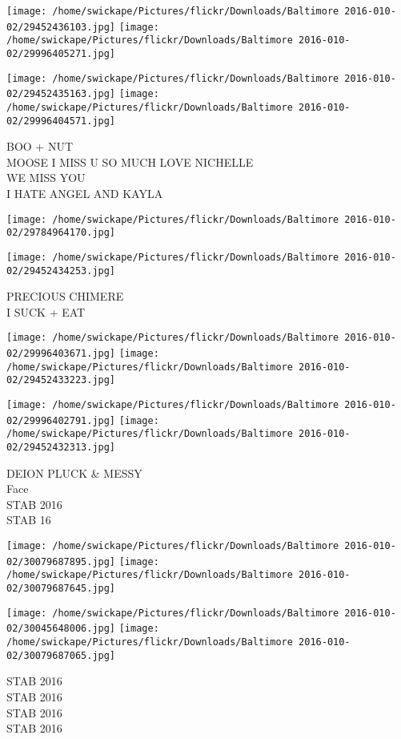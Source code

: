 \documentclass[10pt,letterpaper]{article}
\begin{document}
\texttt{[image: /home/swickape/Pictures/flickr/Downloads/Baltimore 2016-010-02/29452436103.jpg]}
\texttt{[image: /home/swickape/Pictures/flickr/Downloads/Baltimore 2016-010-02/29996405271.jpg]}

\texttt{[image: /home/swickape/Pictures/flickr/Downloads/Baltimore 2016-010-02/29452435163.jpg]}
\texttt{[image: /home/swickape/Pictures/flickr/Downloads/Baltimore 2016-010-02/29996404571.jpg]}

BOO + NUT\\
MOOSE I MISS U SO MUCH LOVE NICHELLE\\
WE MISS YOU\\
I HATE ANGEL AND KAYLA
\pagebreak

\texttt{[image: /home/swickape/Pictures/flickr/Downloads/Baltimore 2016-010-02/29784964170.jpg]}

\vspace{0.25in}
\texttt{[image: /home/swickape/Pictures/flickr/Downloads/Baltimore 2016-010-02/29452434253.jpg]}

PRECIOUS CHIMERE\\
I SUCK + EAT
\pagebreak

\texttt{[image: /home/swickape/Pictures/flickr/Downloads/Baltimore 2016-010-02/29996403671.jpg]}
\texttt{[image: /home/swickape/Pictures/flickr/Downloads/Baltimore 2016-010-02/29452433223.jpg]}

\texttt{[image: /home/swickape/Pictures/flickr/Downloads/Baltimore 2016-010-02/29996402791.jpg]}
\texttt{[image: /home/swickape/Pictures/flickr/Downloads/Baltimore 2016-010-02/29452432313.jpg]}

DEION PLUCK \& MESSY\\
Face\\
STAB 2016\\
STAB 16
\pagebreak

\texttt{[image: /home/swickape/Pictures/flickr/Downloads/Baltimore 2016-010-02/30079687895.jpg]}
\texttt{[image: /home/swickape/Pictures/flickr/Downloads/Baltimore 2016-010-02/30079687645.jpg]}

\texttt{[image: /home/swickape/Pictures/flickr/Downloads/Baltimore 2016-010-02/30045648006.jpg]}
\texttt{[image: /home/swickape/Pictures/flickr/Downloads/Baltimore 2016-010-02/30079687065.jpg]}

STAB 2016\\
STAB 2016\\
STAB 2016\\
STAB 2016
\pagebreak
\end{document}

